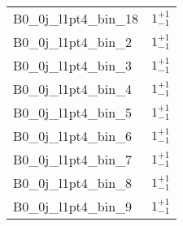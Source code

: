 \begin{tabular}{|l|c|}
B0\_0j\_l1pt4\_bin\_18 & $1^{+1}_{-1}$ \\
B0\_0j\_l1pt4\_bin\_2 & $1^{+1}_{-1}$ \\
B0\_0j\_l1pt4\_bin\_3 & $1^{+1}_{-1}$ \\
B0\_0j\_l1pt4\_bin\_4 & $1^{+1}_{-1}$ \\
B0\_0j\_l1pt4\_bin\_5 & $1^{+1}_{-1}$ \\
B0\_0j\_l1pt4\_bin\_6 & $1^{+1}_{-1}$ \\
B0\_0j\_l1pt4\_bin\_7 & $1^{+1}_{-1}$ \\
B0\_0j\_l1pt4\_bin\_8 & $1^{+1}_{-1}$ \\
B0\_0j\_l1pt4\_bin\_9 & $1^{+1}_{-1}$ \\
\hline
\end{tabular}

